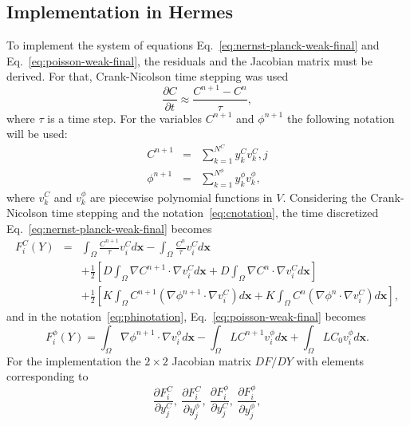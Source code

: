 \subsection{Implementation in Hermes}
To implement the system of equations Eq.~\eqref{eq:nernst-planck-weak-final}
and Eq.~\eqref{eq:poisson-weak-final}, the residuals and the Jacobian
matrix must be derived. For that, Crank-Nicolson time stepping was
used
\begin{equation}
  \frac{\partial C}{\partial t} \approx \frac{C^{n+1} - C^n}{\tau},
  \label{eq:cranic}
\end{equation}
where $\tau$ is a time step. For the variables $C^{n+1}$ and $\phi^{n+1}$ the
following notation will be used:
\begin{eqnarray}
  C^{n+1} &=& \sum_{k=1}^{N^C} y_k^{C} v_k^{C}, \label{eq:cnotation}j\\
  \phi^{n+1} &=& \sum_{k=1}^{N^{\phi}} y_k^{\phi} v_k^{\phi}\label{eq:phinotation},
\end{eqnarray}
where $v_k^C$ and $v_k^\phi$ are piecewise polynomial functions in $V$.
Considering the Crank-Nicolson time stepping and the notation~\eqref{eq:cnotation},
the time discretized Eq.~\eqref{eq:nernst-planck-weak-final} becomes
\begin{eqnarray}
  F_i^C\left(Y\right) & = & \int_{\Omega} \frac{C^{n+1}}{\tau}v_i^C d\mathbf{x} - 
  \int_{\Omega} \frac{C^{n}}{\tau}v_i^C d\mathbf{x}\nonumber\\
  &&+\frac 12 \left[D\int_{\Omega} \nabla C^{n+1} \cdot \nabla v_i^C d\mathbf{x}+ 
  	D\int_{\Omega} \nabla C^{n} \cdot \nabla v_i^C d\mathbf{x}\right]\nonumber\\
  &&+ \frac 12 \left[K\int_{\Omega}C^{n+1} \left(\nabla \phi^{n+1} \cdot \nabla v_i^C\right) d\mathbf{x}+
  K\int_{\Omega}C^{n} \left(\nabla \phi^{n} \cdot \nabla v_i^C\right) d\mathbf{x}\right]\label{eq:Fc},
\end{eqnarray}
and in the notation~\eqref{eq:phinotation}, Eq.~\eqref{eq:poisson-weak-final} becomes
\begin{equation}
  F_i^{\phi}\left(Y\right) = \int_{\Omega} \nabla \phi^{n+1} \cdot \nabla v_i^{\phi} d\mathbf{x} 
  - \int_{\Omega} LC^{n+1}v_i^{\phi} d\mathbf{x} + \int_{\Omega} LC_0 v_i^{\phi} d\mathbf{x}.
  \label{eq:Fphi}
\end{equation}
For the implementation the $2\times 2$ Jacobian matrix $DF/DY$ with elements corresponding to
\begin{equation}
  \frac{\partial F_i^C}{\partial y_j^C}, \ \frac{\partial F_i^C}{\partial y_j^{\phi}},\  
  \frac{\partial F_i^{\phi}}{\partial y_j^C}, \ \frac{\partial F_i^{\phi}}{\partial y_j^{\phi}},
\end{equation}
